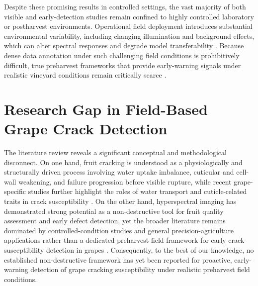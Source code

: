 
\medskip
\noindent
Despite these promising results in controlled settings, the vast majority of both visible and early-detection studies remain confined to highly controlled laboratory or postharvest environments. Operational field deployment introduces substantial environmental variability, including changing illumination and background effects, which can alter spectral responses and degrade model transferability \parencite{Benelli2020, agriculture15202167}. Because dense data annotation under such challenging field conditions is prohibitively difficult, true preharvest frameworks that provide early-warning signals under realistic vineyard conditions remain critically scarce \parencite{haghbin2023non, zhang2024early}.

\section{Research Gap in Field-Based Grape Crack Detection}
\label{sec:research_gap}

\medskip
\noindent
The literature review reveals a significant conceptual and methodological disconnect. On one hand, fruit cracking is understood as a physiologically and structurally driven process involving water uptake imbalance, cuticular and cell-wall weakening, and failure progression before visible rupture, while recent grape-specific studies further highlight the roles of water transport and cuticle-related traits in crack susceptibility \parencite{santos2023molecular, Grimm2019CatastrophicFruitCracking, YU20251506, plants13172400}. On the other hand, hyperspectral imaging has demonstrated strong potential as a non-destructive tool for fruit quality assessment and early defect detection, yet the broader literature remains dominated by controlled-condition studies and general precision-agriculture applications rather than a dedicated preharvest field framework for early crack-susceptibility detection in grapes \parencite{min2023decay, RAM2024109037}. Consequently, to the best of our knowledge, no established non-destructive framework has yet been reported for proactive, early-warning detection of grape cracking susceptibility under realistic preharvest field conditions.

